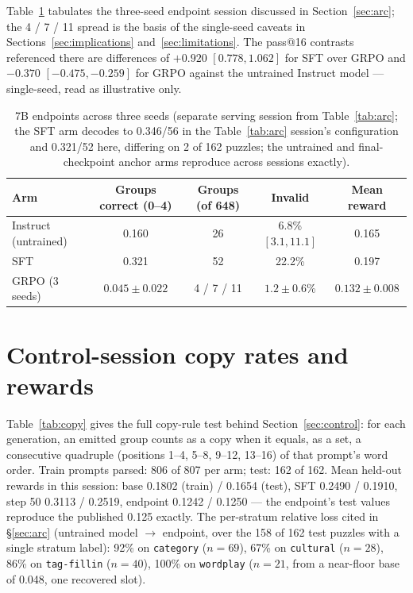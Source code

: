 \documentclass{article}
\begin{document}
Table~\ref{tab:endpoints} tabulates the three-seed endpoint session
discussed in Section~\ref{sec:arc}; the 4 / 7 / 11 spread is the basis of
the single-seed caveats in Sections~\ref{sec:implications}
and~\ref{sec:limitations}. The pass@16 contrasts referenced there are
differences of $+0.920$ $[0.778, 1.062]$ for SFT over GRPO and $-0.370$
$[-0.475, -0.259]$ for GRPO against the untrained Instruct model ---
single-seed, read as illustrative only.

\begin{table}[h]
\centering
\caption{7B endpoints across three seeds (separate serving session from
Table~\ref{tab:arc}; the SFT arm decodes to 0.346/56 in the
Table~\ref{tab:arc} session's configuration and 0.321/52 here, differing on
2 of 162 puzzles; the untrained and final-checkpoint anchor arms reproduce
across sessions exactly).}
\label{tab:endpoints}
\small
\setlength{\tabcolsep}{4pt}
\begin{tabular}{lcccc}
\toprule
Arm & Groups correct (0--4) & Groups (of 648) & Invalid & Mean reward \\
\midrule
Instruct (untrained) & 0.160 & 26 & 6.8\% $[3.1, 11.1]$ & 0.165 \\
SFT   & 0.321 & 52 & 22.2\% & 0.197 \\
GRPO (3 seeds) & $0.045 \pm 0.022$ & 4 / 7 / 11 & $1.2 \pm 0.6$\% & $0.132 \pm 0.008$ \\
\bottomrule
\end{tabular}
\end{table}

\section{Control-session copy rates and rewards}
\label{app:copy}

Table~\ref{tab:copy} gives the full copy-rule test behind
Section~\ref{sec:control}: for each generation, an emitted group counts as
a copy when it equals, as a set, a consecutive quadruple (positions 1--4,
5--8, 9--12, 13--16) of that prompt's word order. Train prompts parsed:
806 of 807 per arm; test: 162 of 162. Mean held-out rewards in this
session: base 0.1802 (train) / 0.1654 (test), SFT 0.2490 / 0.1910, step 50
0.3113 / 0.2519, endpoint 0.1242 / 0.1250 --- the endpoint's test values
reproduce the published 0.125 exactly. The per-stratum relative loss cited
in \S\ref{sec:arc} (untrained model $\to$ endpoint, over the 158 of 162
test puzzles with a single stratum label): 92\% on \texttt{category}
($n=69$), 67\% on \texttt{cultural} ($n=28$), 86\% on \texttt{tag-fillin}
($n=40$), 100\% on \texttt{wordplay} ($n=21$, from a near-floor base of
0.048, one recovered slot).
\end{document}

